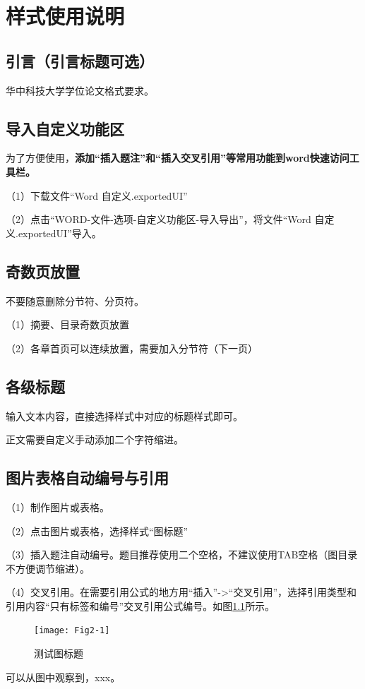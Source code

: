 

\chapter{样式使用说明}
\label{cha:command}


\section{引言（引言标题可选）}
\label{sec:cover}
华中科技大学学位论文格式要求。

\section{导入自定义功能区}
为了方便使用，\textbf{添加“插入题注”和“插入交叉引用”等常用功能到word快速访问工具栏。}

（1）下载文件“Word 自定义.exportedUI”

（2）点击“WORD-文件-选项-自定义功能区-导入导出”，将文件“Word 自定义.exportedUI”导入。


\section{奇数页放置}
不要随意删除分节符、分页符。

（1）摘要、目录奇数页放置

（2）各章首页可以连续放置，需要加入分节符（下一页）

\section{各级标题}
输入文本内容，直接选择样式中对应的标题样式即可。

正文需要自定义手动添加二个字符缩进。


\section{图片表格自动编号与引用}
（1）制作图片或表格。

（2）点击图片或表格，选择样式“图标题”

（3）插入题注自动编号。题目推荐使用二个空格，不建议使用TAB空格（图目录不方便调节缩进）。

（4）交叉引用。在需要引用公式的地方用“插入”->“交叉引用”，选择引用类型和引用内容“只有标签和编号”交叉引用公式编号。如图\ref{Fig2-1}所示。

\begin{figure}[!htbp]
    \centering
    \texttt{[image: Fig2-1]}
    \caption{测试图标题}
    \label{Fig2-1}
\end{figure}
可以从图中观察到，xxx。

